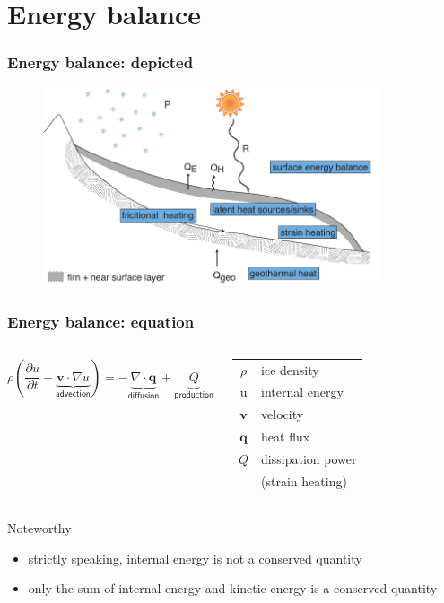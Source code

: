 \documentclass[hide notes,intlimits,handout]{beamer}
\newcommand{\bq}{\mathbf{q}}
\newcommand{\bv}{\mathbf{v}}
\newcommand{\ddt}[1]{\ensuremath{\frac{\partial #1}{\partial t}}}
\newcommand{\Div}{\nabla\cdot}
\newcommand{\grad}{\nabla}
\begin{document}
\section{Energy balance}
\label{sec:energy-balance}

\begin{frame}
  \frametitle{Energy balance: depicted}
  \begin{figure}
    \includegraphics[width=10cm]{figures/glacier_thermodynamics}
  \end{figure}
\end{frame}


\begin{frame}
  \frametitle{Energy balance: equation}
  \begin{columns}
    \column[c]{7cm}
    \begin{equation*}
      \rho \left(\ddt{u} + \underbrace{\bv \cdot \grad u}_{\textsf{advection}}\right) = - \underbrace{\Div \bq}_{\textsf{diffusion}} + \underbrace{Q}_{\textsf{production}}
    \end{equation*}
   \vspace{2em}
    \column[c]{6cm}
      \begin{tabular}{cl}
        $\rho$ \quad & ice density \\
        u \quad & internal energy \\
        $\bv$ \quad & velocity \\
        $\bq$ \quad & heat flux \\
        $Q$ \quad & dissipation power \\
             & (strain heating)
      \end{tabular}
    \end{columns}
    \begin{block}{Noteworthy}
      \begin{itemize}
      \item strictly speaking, internal energy is \alert{not} a conserved quantity
      \item only the sum of \alert{internal energy} and \alert{kinetic energy} is a conserved quantity
      \end{itemize}
    \end{block}
\end{frame}
\end{document}
